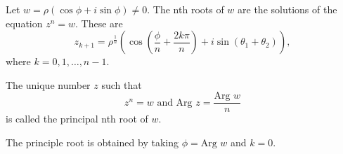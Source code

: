 \documentclass[11pt,reqno,oneside,a4paper]{article}
\begin{document}
Let $w = \rho (\cos \phi + i\sin \phi) \neq 0.$ The nth roots of $w$ are the solutions of the equation $z^n= w$. These are
$$z_{k+1} = \rho^{\frac{1}{n}}(\cos(\frac{\phi}{n}+\frac{2k\pi}{n})+ i\sin(\theta_1 +\theta_2)),$$
where $k = 0,1,\dots,n-1$.

The unique number $z$ such that 
$$z^n =w \text{ and Arg }z = \frac{\text{Arg }w}{n}$$
is called the principal nth root of $w$.

The principle root is obtained by taking $\phi = \text{Arg }w$ and $k=0$. 



{\small}
\end{document}
